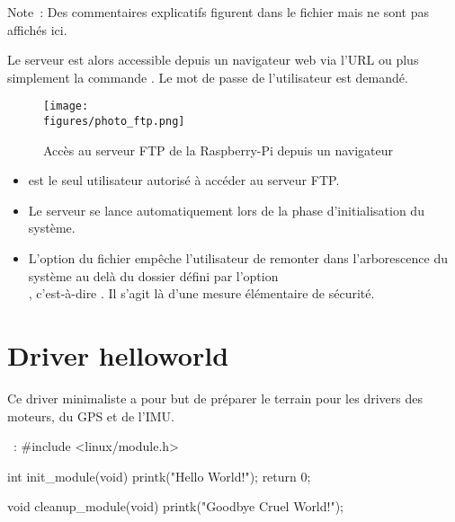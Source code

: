 Note~: Des commentaires explicatifs figurent dans le fichier  mais ne sont pas affichés ici.

\vspace{1cm}

Le serveur est alors accessible depuis un navigateur web via l'URL  ou plus simplement la commande . Le mot de passe de l'utilisateur  est demandé.

\begin{figure}[H]
    \centering
    \texttt{[image: \\figures/photo\_ftp.png]}
    \decoRule
    \caption[
    Accès au serveur FTP de la Raspberry-Pi depuis un navigateur]{
    Accès au serveur FTP de la Raspberry-Pi depuis un navigateur}
    \label{fig:Accès au serveur FTP de la Raspberry-Pi depuis un navigateur}
    \end{figure}

\vspace{1cm}

\begin{itemize}[label=$\bullet$]
	\item {} est le seul utilisateur autorisé à accéder au serveur FTP.
	\item Le serveur se lance automatiquement lors de la phase d'initialisation du système.
	\item L'option  du fichier  empêche l'utilisateur de remonter dans l'arborescence du système au delà du dossier défini par l'option\\, c'est-à-dire . Il s'agit là d'une mesure élémentaire de sécurité.
	\end{itemize}

\section{Driver helloworld}

Ce driver minimaliste a pour but de préparer le terrain pour les drivers des moteurs, du GPS et de l'IMU.

~:
#include <linux/module.h>

int init_module(void)
{
    printk("Hello World!\n");
    return 0;
}

void cleanup_module(void)
{
    printk("Goodbye Cruel World!\n");
}

